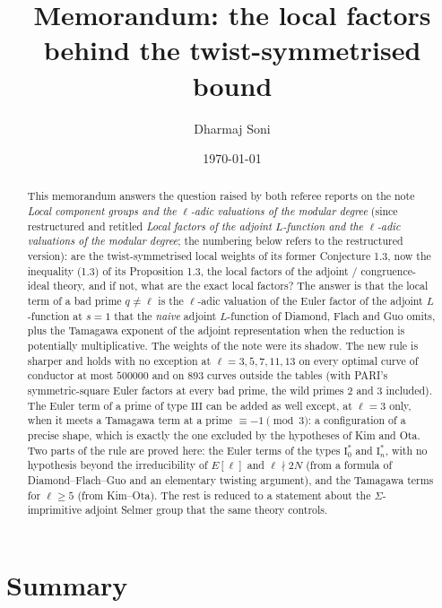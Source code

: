 \documentclass[11pt]{amsart}
\title{Memorandum: the local factors behind the twist-symmetrised bound}
\author{Dharmaj Soni}
\date{\today}
\theoremstyle{definition}
\begin{document}
\begin{abstract}
This memorandum answers the question raised by both referee reports on the note \emph{Local component groups and the $\ell$-adic valuations of the modular degree} (since restructured and retitled \emph{Local factors of the adjoint $L$-function and the $\ell$-adic valuations of the modular degree}; the numbering below refers to the restructured version): are the twist-symmetrised local weights of its former Conjecture 1.3, now the inequality (1.3) of its Proposition 1.3, the local factors of the adjoint / congruence-ideal theory, and if not, what are the exact local factors? The answer is that the local term of a bad prime $q\ne\ell$ is the $\ell$-adic valuation of the Euler factor of the adjoint $L$-function at $s=1$ that the \emph{naive} adjoint $L$-function of Diamond, Flach and Guo omits, plus the Tamagawa exponent of the adjoint representation when the reduction is potentially multiplicative. The weights of the note were its shadow. The new rule is sharper and holds with no exception at $\ell=3,5,7,11,13$ on every optimal curve of conductor at most $500000$ and on $893$ curves outside the tables (with PARI's symmetric-square Euler factors at every bad prime, the wild primes $2$ and $3$ included). The Euler term of a prime of type $\mathrm{III}$ can be added as well except, at $\ell=3$ only, when it meets a Tamagawa term at a prime $\equiv-1\pmod3$: a configuration of a precise shape, which is exactly the one excluded by the hypotheses of Kim and Ota. Two parts of the rule are proved here: the Euler terms of the types $\mathrm{I}_0^*$ and $\mathrm{I}_n^*$, with no hypothesis beyond the irreducibility of $E[\ell]$ and $\ell\nmid 2N$ (from a formula of Diamond--Flach--Guo and an elementary twisting argument), and the Tamagawa terms for $\ell\ge5$ (from Kim--Ota). The rest is reduced to a statement about the $\Sigma$-imprimitive adjoint Selmer group that the same theory controls.
\end{abstract}
\maketitle

\section{Summary}\label{sec:summary}
\end{document}
